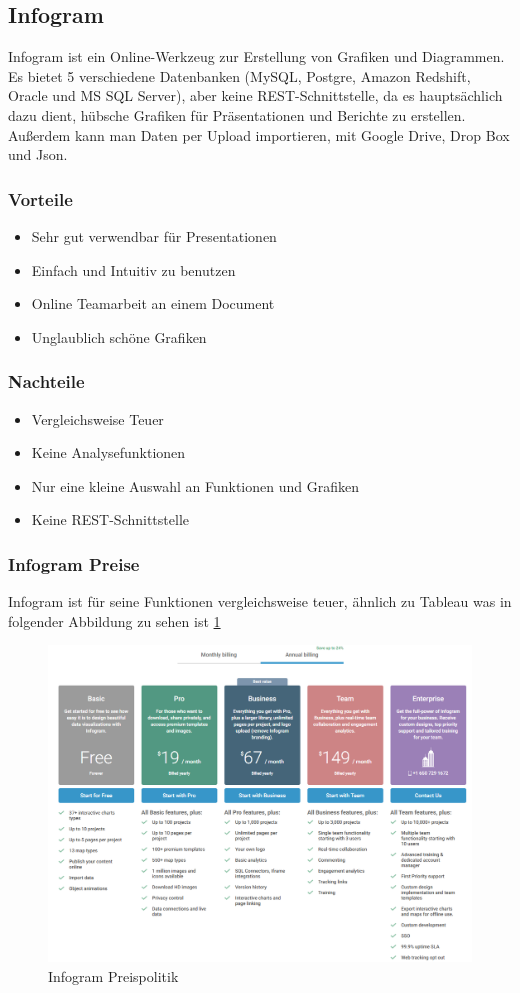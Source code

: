 \subsection{Infogram}
Infogram ist ein Online-Werkzeug zur Erstellung von Grafiken und Diagrammen.
Es bietet 5 verschiedene Datenbanken (MySQL, Postgre, Amazon Redshift, Oracle und MS SQL Server), aber keine REST-Schnittstelle, da es hauptsächlich dazu dient, hübsche Grafiken für Präsentationen und Berichte zu erstellen.
Außerdem kann man Daten per Upload importieren, mit Google Drive, Drop Box und Json. 
\subsubsection{Vorteile} 
\begin{itemize}
\item Sehr gut verwendbar für Presentationen
\item Einfach und Intuitiv zu benutzen
\item Online Teamarbeit an einem Document
\item Unglaublich schöne Grafiken
\end{itemize}
\subsubsection{Nachteile}
\begin{itemize}
\item Vergleichsweise Teuer
\item Keine Analysefunktionen
\item Nur eine kleine Auswahl an Funktionen und Grafiken
\item Keine REST-Schnittstelle
\end{itemize}
\subsubsection{Infogram Preise}
Infogram ist für seine Funktionen vergleichsweise teuer, ähnlich zu Tableau was in folgender Abbildung zu sehen ist \ref{img:infogram_preise}
\begin{figure}[h]
    \includegraphics[scale=.50]{images/Infogram_Preise.png}
    \caption{Infogram Preispolitik}
    \label{img:infogram_preise}
\end{figure}
